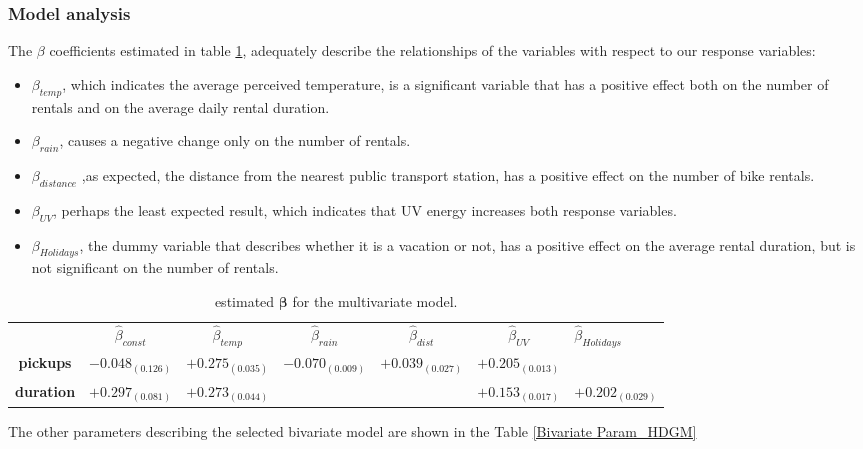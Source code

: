 \subsubsection{Model analysis} 
The $\beta$ coefficients estimated in table \ref*{Bivariate Beta HDGM},
adequately describe the relationships of the variables with respect to our response variables:
\begin{itemize}
	\item $\beta_{temp}$, which indicates the average perceived temperature, is a significant variable that has a positive effect both on the number of rentals and on the average daily rental duration.
	\item $\beta_{rain}$, causes a negative change only on the number of rentals.
	\item $\beta_{distance}$ ,as expected, the distance from the nearest public transport station, has a positive effect on the number of bike rentals.
	\item $\beta_{UV}$, perhaps the least expected result, which indicates that UV energy increases both response variables.
	\item $\beta_{Holidays}$, the dummy variable that describes whether it is a vacation or not, has a positive effect on the average rental duration, but is not significant on the number of rentals.
\end{itemize}
\begin{table}[h!]
	\centering
	\renewcommand\arraystretch{1.3}
	\begin{tabular}{|ccccccl}
		\hline
		& $\hat{\beta}_{const}$  & $\hat{\beta}_{temp}$ & $\hat{\beta}_{rain}$ & $\hat{\beta}_{dist}$ & $\hat{\beta}_{UV}$ &$\hat{\beta}_{Holidays}$      \\ \cline{2-7} 
		\multicolumn{1}{|c|}{\textbf{pickups}}  & $-0.048_{(0.126)}$ & $+0.275_{(0.035)}$ & $-0.070_{(0.009)}$ & $+0.039_{(0.027)}$ & $+0.205_{(0.013)}$ &              \\
		\multicolumn{1}{|c|}{\textbf{duration}} & $+0.297_{(0.081)}$  & $+0.273_{(0.044)}$ &               &               & $+0.153_{(0.017)}$  & $+0.202_{(0.029)}$
	\end{tabular}
	\caption[Estimated $\boldsymbol{\beta}$ for the multivariate model (HDGM)]{estimated $\boldsymbol{\beta}$ for the multivariate model.}
	\label{Bivariate Beta HDGM}
\end{table}
The other parameters describing the selected bivariate model are shown in the Table \ref{Bivariate Param_HDGM}
